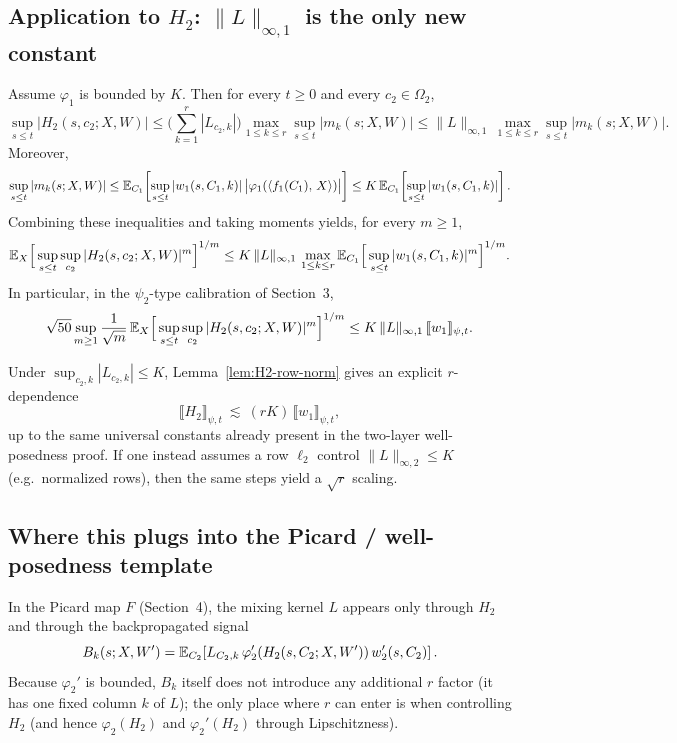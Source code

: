 \subsection{Application to $H_2$: $\|L\|_{\infty,1}$ is the only new constant}

\begin{lemma}\label{lem:H2-row-norm}
Assume $\varphi_1$ is bounded by $K$.
Then for every $t\ge 0$ and every $c_2\in\Omega_2$,
\[
\sup_{s\le t}\big|H_2(s,c_2;X,W)\big|
\le \Big(\sum_{k=1}^r |L_{c_2,k}|\Big)\max_{1\le k\le r}\sup_{s\le t}|m_k(s;X,W)|
\le \|L\|_{\infty,1}\,\max_{1\le k\le r}\sup_{s\le t}|m_k(s;X,W)|.
\]
Moreover,
\[
\sup_{s\le t}|m_k(s;X,W)|
\le \mathbb{E}_{C_1}\!\left[\sup_{s\le t}|w_1(s,C_1,k)|\,\big|\varphi_1(\left\langle f_1(C_1),\,X \right\rangle)\big|\right]
\le K\,\mathbb{E}_{C_1}\!\left[\sup_{s\le t}|w_1(s,C_1,k)|\right].
\]
Combining these inequalities and taking moments yields, for every $m\ge 1$,
\[
\mathbb{E}_X\Big[\sup_{s\le t}\sup_{c_2}|H_2(s,c_2;X,W)|^m\Big]^{1/m}
\le K\,\|L\|_{\infty,1}\,\max_{1\le k\le r}\mathbb{E}_{C_1}\Big[\sup_{s\le t}|w_1(s,C_1,k)|^m\Big]^{1/m}.
\]
In particular, in the $\psi_2$-type calibration of Section~3,
\[
\sqrt{50}\sup_{m\ge 1}\frac{1}{\sqrt{m}}\,
\mathbb{E}_X\Big[\sup_{s\le t}\sup_{c_2}|H_2(s,c_2;X,W)|^m\Big]^{1/m}
\le K\,\|L\|_{\infty,1}\,\llbracket w_1\rrbracket_{\psi,t}.
\]
\end{lemma}

\begin{remark}
Under $\sup_{c_2,k}|L_{c_2,k}|\le K$, Lemma~\ref{lem:H2-row-norm} gives an explicit $r$-dependence
\[
\llbracket H_2\rrbracket_{\psi,t}\ \lesssim\ (rK)\,\llbracket w_1\rrbracket_{\psi,t},
\]
up to the same universal constants already present in the two-layer well-posedness proof.
If one instead assumes a row $\ell_2$ control $\|L\|_{\infty,2}\le K$ (e.g.\ normalized rows), then the same steps yield a $\sqrt{r}$ scaling.
\end{remark}

\subsection{Where this plugs into the Picard / well-posedness template}

In the Picard map $F$ (Section~4), the mixing kernel $L$ appears only through $H_2$ and through the backpropagated signal
\[
B_k(s;X,W')=\mathbb{E}_{C_2}\!\left[L_{C_2,k}\,\varphi_2'(H_2(s,C_2;X,W'))\,w_2'(s,C_2)\right].
\]
Because $\varphi_2'$ is bounded, $B_k$ itself does not introduce any additional $r$ factor (it has one fixed column $k$ of $L$); the only place where $r$ can enter is when controlling $H_2$ (and hence $\varphi_2(H_2)$ and $\varphi_2'(H_2)$ through Lipschitzness).


